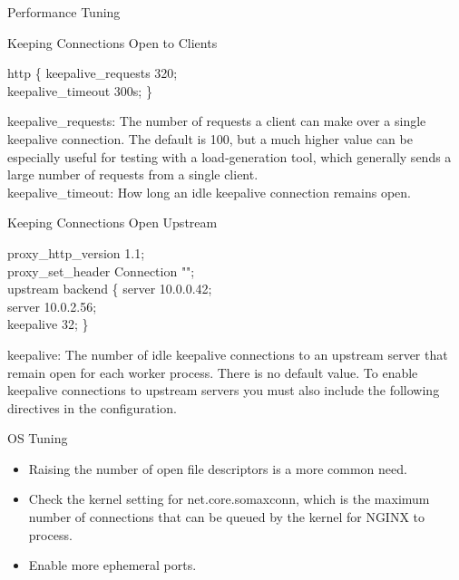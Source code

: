\documentclass{beamer}
\begin{document}
\begin{frame}{Performance Tuning}
\begin{block}{Keeping Connections Open to Clients}
	\vspace{0.02\textheight}
	\scriptsize
	\begin{Alms*}
		http \{ \NI
		keepalive\_requests 320; \\
		keepalive\_timeout 300s;
		\ND \}
	\end{Alms*}
keepalive\_requests: The number of requests a client can make over a single keepalive connection. The default is 100, but a much higher value can be especially useful for testing with a load‑generation tool, which generally sends a large number of requests from a single client. \\
keepalive\_timeout: How long an idle keepalive connection remains open.
\end{block}

\begin{block}{Keeping Connections Open Upstream}
	\vspace{0.02\textheight}
	\scriptsize
	\begin{Alms*}
		proxy\_http\_version 1.1; \\
		proxy\_set\_header Connection ""; \\
		upstream backend \{ \NI
			server 10.0.0.42; \\
			server 10.0.2.56; \\
			keepalive 32;
		\ND \}
	\end{Alms*}

keepalive: The number of idle keepalive connections to an upstream server that remain open for each worker process. There is no default value.
To enable keepalive connections to upstream servers you must also include the following directives in the configuration.
\end{block}
\end{frame}


\begin{frame}{OS Tuning\cite{sharma2015nginx}}
\begin{itemize}
	\item Raising the number of open file descriptors is a more common need.
	\item Check the kernel setting for net.core.somaxconn, which is the maximum number of connections that can be queued by the kernel for NGINX to process. 
	\item Enable more ephemeral ports. 
\end{itemize}

\end{frame}
\end{document}
